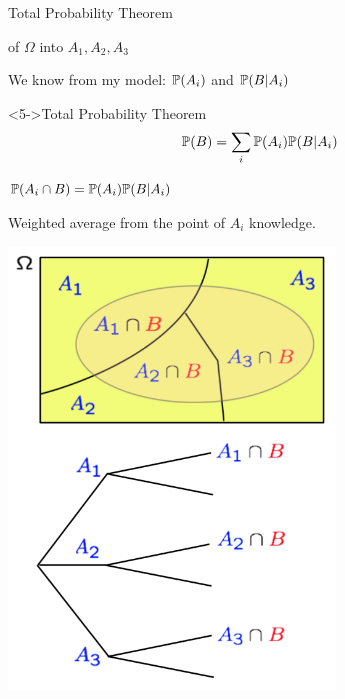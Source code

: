 \documentclass[fleqn,aspectratio=169]{beamer}
\begin{document}
\begin{frame}{Total Probability Theorem}

{
\plitemsep 0.1in
\bci 

\item<2->  of $\Omega$ into $A_1,A_2,A_3$

\item<3-> We know from my model: $\mathbb{P}( A_i )$ and $\mathbb{P}( B | A_i )$ 

\item<4-> 


\begin{block}<5->{Total Probability Theorem}
$$
\mathbb{P}( B ) = \sum_{i} \mathbb{P}( A_i ) \mathbb{P}( B | A_i )
$$
\end{block}

\item<5-> $\mathbb{P}( A_i \cap B ) = \mathbb{P}( A_i ) \mathbb{P}( B | A_i )$

\item<6-> Weighted average from the point of $A_i$ knowledge. 
\eci 
}
{
\centering
\includegraphics[width=0.65\textwidth]{L2_total_ex.png}
}

\end{frame}
\end{document}
